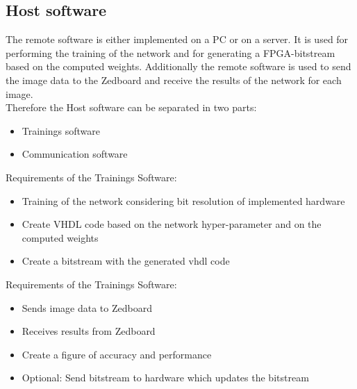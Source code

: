 \subsection{Host software}
The remote software is either implemented on a PC or on a server. It is used for performing the training of the network and for generating a FPGA-bitstream based on the computed weights. Additionally the remote software is used to send the image data to the Zedboard and receive the results of the network for each image. \\
Therefore the Host software can be separated in two parts:
\begin{itemize}
	\item Trainings software
	\item Communication software
\end{itemize} 
Requirements of the Trainings Software:
\begin{itemize} 
	\item Training of the network considering bit resolution of implemented hardware
	\item Create VHDL code based on the network hyper-parameter and on the computed weights
	\item Create a bitstream with the generated vhdl code
\end{itemize}
Requirements of the Trainings Software:
\begin{itemize}
	\item Sends image data to Zedboard
	\item Receives results from Zedboard
	\item Create a figure of accuracy and performance   
	\item Optional: Send bitstream to hardware which updates the bitstream 
\end{itemize}
